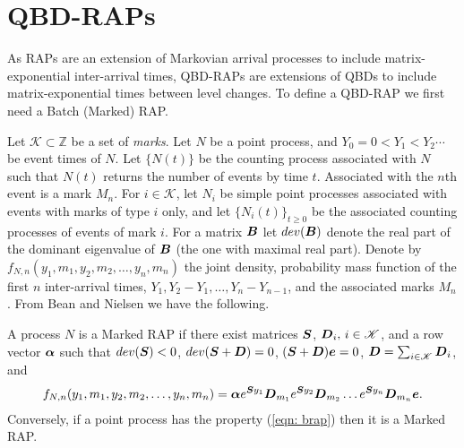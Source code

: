 %
%

\section{QBD-RAPs}\label{sec: qbd-rap}
As RAPs are an extension of Markovian arrival processes to include matrix-exponential inter-arrival times, QBD-RAPs are extensions of QBDs to include matrix-exponential times between level changes. To define a QBD-RAP we first need a Batch (Marked) RAP. 

Let \(\mathscr K\subset \mathbb Z\) be a set of \emph{marks}. Let \(N\) be a point process, and \(Y_0=0<Y_1<Y_2\cdots\) be event times of \(N\). Let \(\{N(t)\}\) be the counting process associated with \(N\) such that \(N(t)\) returns the number of events by time \(t\). Associated with the \(n\)th event is a mark \(M_n\). For \(i\in\mathscr K\), let \(N_i\) be simple point processes associated with events with marks of type \(i\) only, and let \(\{N_i(t)\}_{t\geq 0}\) be the associated counting processes of events of mark \(i\). For a matrix \(\boldsymbol B\) let \(dev(\boldsymbol B)\) denote the real part of the dominant eigenvalue of \(\boldsymbol B\) (the one with maximal real part). Denote by \(f_{N,n}(y_1,m_1,y_2,m_2,\dots,y_n,m_n)\) the joint density, probability mass function of the first \(n\) inter-arrival times, \(Y_1,Y_2-Y_1,\dots,Y_n-Y_{n-1}\), and the associated marks \(M_n\). From Bean and Nielsen \cite[Theorem 1]{bn2010} we have the following. 
\begin{thm}
A process \(N\) is a Marked RAP if there exist matrices \(\boldsymbol S\), \(\boldsymbol D_i,\,i\in\mathscr K\), and a row vector \(\boldsymbol \alpha\) such that \(dev(\boldsymbol S)<0\), \(dev(\boldsymbol S+\boldsymbol D)=0\), \((\boldsymbol S+\boldsymbol D)\boldsymbol e = 0\), \(\boldsymbol D = \sum_{i\in\mathscr K} \boldsymbol D_i\), and 
\begin{align}f_{N,n}(y_1,m_1,y_2,m_2,\dots,y_n,m_n) = \boldsymbol \alpha e^{\boldsymbol S y_1}\boldsymbol D_{m_1} e^{\boldsymbol S y_2} \boldsymbol D_{m_2}\dots e^{\boldsymbol S y_n} \boldsymbol D_{m_n}\boldsymbol e.\label{eqn: brap}\end{align}
Conversely, if a point process has the property (\ref{eqn: brap}) then it is a Marked RAP.
\end{thm}

